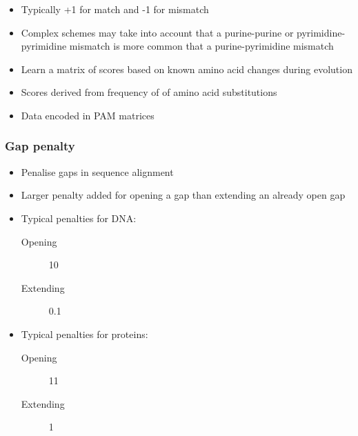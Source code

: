 \documentclass[a4paper]{article}
\begin{document}

\begin{itemize}
  \item
    Typically +1 for match and -1 for mismatch

  \item
    Complex schemes may take into account that a purine-purine or
    pyrimidine-pyrimidine mismatch is more common that a purine-pyrimidine
    mismatch
\end{itemize}


\begin{itemize}
  \item
    Learn a matrix of scores based on known amino acid changes during evolution

  \item
    Scores derived from frequency of of amino acid substitutions

  \item
    Data encoded in PAM matrices
\end{itemize}

\subsubsection{Gap penalty}

\begin{itemize}
  \item
    Penalise gaps in sequence alignment

  \item
    Larger penalty added for opening a gap than extending an already open gap

  \item
    Typical penalties for DNA:

    \begin{description}
      \item[Opening] 10
      \item[Extending] 0.1
    \end{description}

  \item
    Typical penalties for proteins:

    \begin{description}
      \item[Opening] 11
      \item[Extending] 1
    \end{description}
\end{itemize}
\end{document}
